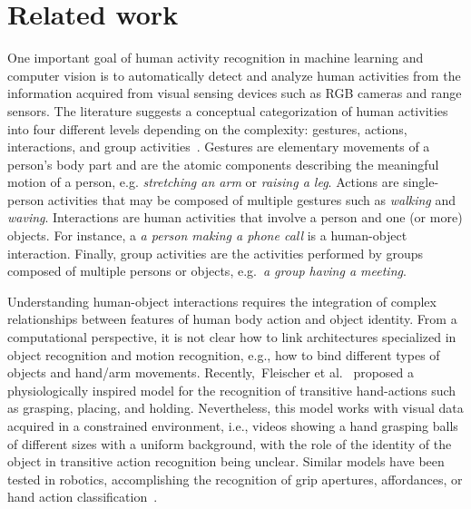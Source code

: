\documentclass[5p,times]{elsarticle}
\begin{document}
\section{Related work}\label{sec:material}

One important goal of human activity recognition in machine learning and computer vision is to automatically detect and analyze human activities from the information acquired from visual sensing devices such as RGB cameras and range sensors.
The literature suggests a conceptual categorization of human activities into four different levels depending on the complexity: gestures, actions, interactions, and group activities~\cite{aggarwal2011human,ziaeefard2015semantic,aggarwal2014human}.
Gestures are elementary movements of a person's body part and are the atomic components describing the meaningful motion of a person, e.g. \textit{stretching an arm} or \textit{raising a leg}.
Actions are single-person activities that may be composed of multiple gestures such as \textit{walking} and \textit{waving}.
Interactions are human activities that involve a person and one (or more) objects.
For instance, a \textit{a person making a phone call} is a human-object interaction.
Finally, group activities are the activities performed by groups composed of multiple persons or objects, e.g.~\textit{a group having a meeting}.

Understanding human-object interactions requires the integration of complex relationships between features of human body action and object identity.
From a computational perspective, it is not clear how to link architectures specialized in object recognition and motion recognition, e.g., how to bind different types of objects and hand/arm movements.
Recently,~Fleischer et al.~\citep{Fleischer} proposed a physiologically inspired model for the recognition of transitive hand-actions such as grasping, placing, and holding.
Nevertheless, this model works with visual data acquired in a constrained environment, i.e., videos showing a hand grasping balls of different sizes with a uniform background, with the role of the identity of the object in transitive action recognition being unclear.
Similar models have been tested in robotics, accomplishing the recognition of grip apertures, affordances, or hand action classification~\cite{prevete2008connectionist,tessitore2010motor}.
\end{document}
